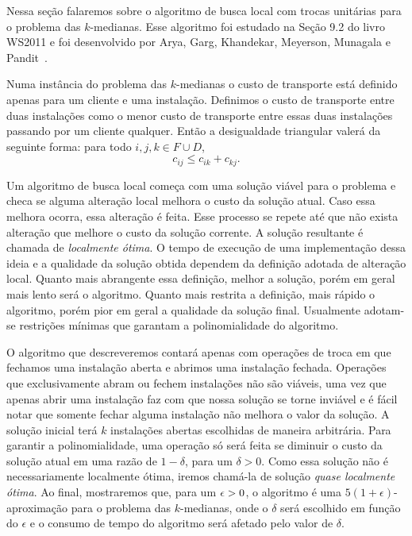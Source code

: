 Nessa seção falaremos sobre o algoritmo de busca local com trocas unitárias para o problema das $k$-medianas. Esse algoritmo foi estudado na Seção 9.2 do livro WS2011 e foi desenvolvido por Arya, Garg, Khandekar, Meyerson, Munagala e Pandit~\cite{AryaLocal}.

Numa instância do problema das $k$-medianas o custo de transporte está definido apenas para um cliente e uma instalação.
Definimos o custo de transporte entre duas instalações como o menor custo de transporte entre essas duas instalações passando por um cliente qualquer. Então a desigualdade triangular valerá da seguinte forma: para todo $i,j,k \in F \cup D$,
\[ c_{ij} \leq c_{ik} + c_{kj}.\]

Um algoritmo de busca local começa com uma solução viável para o problema e checa se alguma alteração local melhora o custo da solução atual. Caso essa melhora ocorra, essa alteração é feita. Esse processo se repete até que não exista alteração que melhore o custo da solução corrente. A solução resultante é chamada de \emph{localmente ótima}. O tempo de execução de uma implementação dessa ideia e a qualidade da solução obtida dependem da definição adotada de alteração local. Quanto mais abrangente essa definição, melhor a solução, porém em geral mais lento será o algoritmo. Quanto mais restrita a definição, mais rápido o algoritmo, porém pior em geral a qualidade da solução final. Usualmente adotam-se restrições mínimas que garantam a polinomialidade do algoritmo.

O algoritmo que descreveremos contará apenas com operações de troca em que fechamos uma instalação aberta e abrimos uma instalação fechada. Operações que exclusivamente abram ou fechem instalações não são viáveis, uma vez que apenas abrir uma instalação faz com que nossa solução se torne inviável e é fácil notar que somente fechar alguma instalação não melhora o valor da solução. A solução inicial terá  $k$ instalações abertas escolhidas de maneira arbitrária. Para garantir a polinomialidade, uma operação só será feita se diminuir o custo da solução atual em uma razão de $1-\delta$, para um $\delta>0$. Como essa solução não é necessariamente localmente ótima, iremos chamá-la de solução \emph{quase localmente ótima}. Ao final, mostraremos que, para um $\epsilon > 0$, o algoritmo é uma $5(1 + \epsilon)$-aproximação para o problema das $k$-medianas, onde o $\delta$ será escolhido em função do $\epsilon$ e o consumo de tempo do algoritmo será afetado pelo valor de $\delta$.

